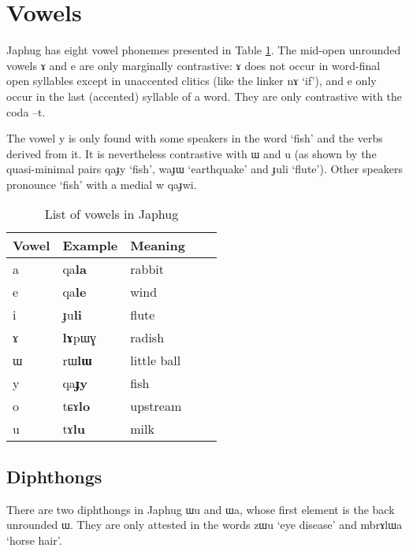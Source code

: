 \documentclass[oldfontcommands,oneside,a4paper,11pt]{article}
\newcommand{\ipa}[1]{{\phon #1}} %
\begin{document}
     \section{Vowels} \label{sec:vowels}
     
     
     Japhug has eight vowel phonemes presented in Table \ref{tab:vowels}. The mid-open unrounded vowels \ipa{ɤ} and \ipa{e} are only marginally contrastive: \ipa{ɤ} does not occur in word-final open syllables except in unaccented clitics (like the linker \ipa{nɤ} `if'), and \ipa{e} only occur in the last (accented) syllable of a word. They are only contrastive with the coda \ipa{--t}.
     
The vowel \ipa{y} is only found with some speakers in the word `fish' and the verbs derived from it. It is nevertheless contrastive with \ipa{ɯ} and \ipa{u} (as shown by the quasi-minimal pairs \ipa{qaɟy} `fish', \ipa{waɟɯ} `earthquake' and \ipa{ɟuli} `flute'). Other speakers pronounce `fish' with a medial \ipa{w} \ipa{qaɟwi}.
     
     \begin{table}
      \caption{List of vowels in Japhug} \label{tab:vowels}  \centering
     \begin{tabular}{lllll}
     \toprule
Vowel & Example & Meaning \\
\midrule
\ipa{a} &	\ipa{qa\textbf{la}} & rabbit\\
\ipa{e} &	\ipa{qa\textbf{le}} &wind\\
\ipa{i} &	\ipa{ɟu\textbf{li}} &flute\\
\ipa{ɤ} &	\ipa{\textbf{lɤ}pɯɣ} & radish\\
\ipa{ɯ} &	\ipa{rɯ\textbf{lɯ}} &little ball\\
\ipa{y} &	\ipa{qa\textbf{ɟy}} &fish\\
\ipa{o} &	\ipa{tɕɤ\textbf{lo}} &upstream\\
\ipa{u} &	\ipa{tɤ\textbf{lu}} &milk\\
     \bottomrule
     \end{tabular}
     \end{table}
     
     
          \subsection{Diphthongs}
          
          There are two diphthongs in Japhug \ipa{ɯu} and \ipa{ɯa}, whose first element is the back unrounded \ipa{ɯ}. They are only attested in the words \ipa{zɯu} `eye disease' and \ipa{mbrɤlɯa} `horse hair'. 
          
\end{document}

